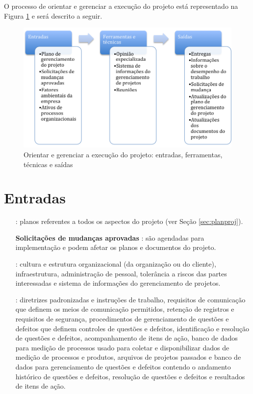 O processo de orientar e gerenciar a execução do projeto está representado na Figura \ref{fig:ori:ger:exe:projeto:etfs} e será descrito a seguir.

\begin{figure}[!h]
	\centering
	\includegraphics[scale=0.75]{Figuras/ori_ger_exec_proj_efts.png}
	\caption{Orientar e gerenciar a execução do projeto: entradas, ferramentas, técnicas e saídas}
	\label{fig:ori:ger:exe:projeto:etfs}
\end{figure}

\section{Entradas}

\begin{itemize}
	
	\item[\textbf{\planproj}]: planos referentes a todos os aspectos do projeto (ver Seção \ref{sec:planproj}).
	
	\item[\textbf{Solicitações de mudanças aprovadas}]: são agendadas para implementação e podem afetar os planos e documentos do projeto.
	
	\item[\textbf{\amb}]: cultura e estrutura organizacional (da organização ou do cliente), infraestrutura, administração de pessoal, tolerância a riscos das partes interessadas e sistema de informações do gerenciamento de projetos. 
	
	\item[\textbf{\ativ}]: diretrizes padronizadas e instruções de trabalho, requisitos de comunicação que definem os meios de comunicação permitidos, retenção de registros e requisitos de segurança, procedimentos de gerenciamento de questões e defeitos que definem controles de questões e defeitos, identificação e resolução de questões e defeitos, acompanhamento de itens de ação, banco de dados para medição de processos usado para coletar e disponibilizar dados de medição de processos e produtos, arquivos de projetos passados e banco de dados para gerenciamento de questões e defeitos contendo o andamento histórico de questões e defeitos, resolução de questões e defeitos e resultados de itens de ação.
	
\end{itemize}

